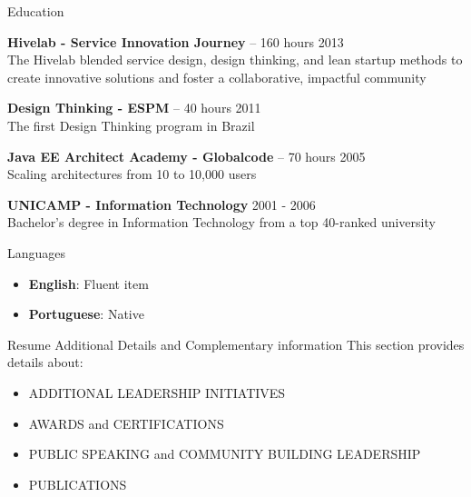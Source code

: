 \documentclass{resume} %
\begin{document}

\begin{rSection}{Education}

{\bf Hivelab - Service Innovation Journey} -- 160 hours \hfill 2013\\
The Hivelab blended service design, design thinking, and lean startup methods to create innovative solutions and foster a collaborative, impactful community 

{\bf Design Thinking - ESPM} -- 40 hours \hfill 2011\\
The first Design Thinking program in Brazil 

{\bf Java EE Architect Academy - Globalcode} -- 70 hours \hfill 2005\\
Scaling architectures from 10 to 10,000 users

{\bf UNICAMP - Information Technology} \hfill 2001 - 2006\\
Bachelor's degree in Information Technology from a top 40-ranked university

\end{rSection}
\begin{rSection}{Languages} 
\begin{itemize}
    \item \textbf{English}: Fluent item 
    \item \textbf{Portuguese}: Native
\end{itemize}
\end{rSection}

\break

\begin{rSection}{Resume Additional Details and Complementary information} 
This section provides details about: 
\begin{itemize}
    \item ADDITIONAL LEADERSHIP INITIATIVES
    \item AWARDS and CERTIFICATIONS
    \item PUBLIC SPEAKING and COMMUNITY BUILDING LEADERSHIP
    \item PUBLICATIONS
\end{itemize}    
\end{rSection}
\end{document}
